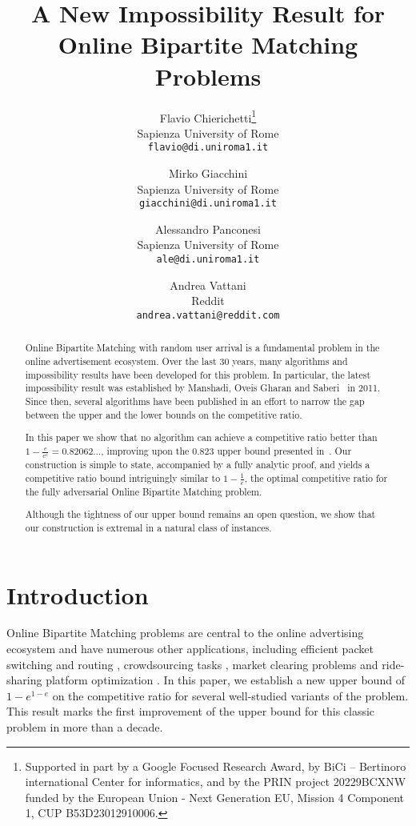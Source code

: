 \documentclass[11pt]{article}
\title{A New Impossibility Result for Online Bipartite Matching Problems}
\author{Flavio Chierichetti\thanks{Supported in part by a  Google Focused Research Award,   by
BiCi -- Bertinoro international Center for informatics, and by the PRIN project 20229BCXNW funded by the European Union - Next Generation EU, Mission 4 Component 1,
CUP B53D23012910006.}\\
Sapienza University of Rome\\
\texttt{\large flavio@di.uniroma1.it}
\and
Mirko Giacchini\footnotemark[1]\\
Sapienza University of Rome\\
\texttt{\large giacchini@di.uniroma1.it}
\and
Alessandro Panconesi\footnotemark[1]\\
Sapienza University of Rome\\
\texttt{\large ale@di.uniroma1.it}
\and
Andrea Vattani\\
Reddit\\
\texttt{\large andrea.vattani@reddit.com}
}
\date{}
\begin{document}
\maketitle

\begin{abstract}
Online Bipartite Matching with random user arrival is a fundamental problem in the online advertisement ecosystem. Over the last 30 years, many algorithms and impossibility results have been developed for this problem. In particular, the latest impossibility result was established by Manshadi, Oveis Gharan and Saberi~\cite{mos11} in 2011. Since then, several algorithms have been published in an effort to narrow the gap between the upper and the lower bounds on the competitive ratio.

\smallskip

In this paper we show that no algorithm can achieve a competitive ratio better than $1- \frac e{e^e} = 0.82062\ldots$, improving upon the $0.823$ upper bound presented in~\cite{mos11}.
Our construction is simple to state, accompanied by a fully analytic proof, and yields a competitive ratio bound  intriguingly similar to $1 - \frac1e$, the optimal competitive ratio for the fully adversarial Online Bipartite Matching problem. 

\smallskip

Although the tightness of our upper bound remains an open question, we show that our construction is extremal in a natural class of instances.
\end{abstract}


\section{Introduction}

Online Bipartite Matching problems are central to the online advertising ecosystem \cite{mos11,my11,kmt11,mehta13} and have numerous other applications, including efficient packet switching and routing \cite{az06,ap02}, crowdsourcing tasks \cite{tsdwc16},  market clearing problems \cite{bsz06} and ride-sharing platform optimization \cite{dssx21}.  
In this paper, we establish a new upper bound of $1 - e^{1-e}$
on the competitive ratio for several well-studied variants of the problem. This result marks the first improvement of the upper bound for this classic problem in more than a decade.
\end{document}
